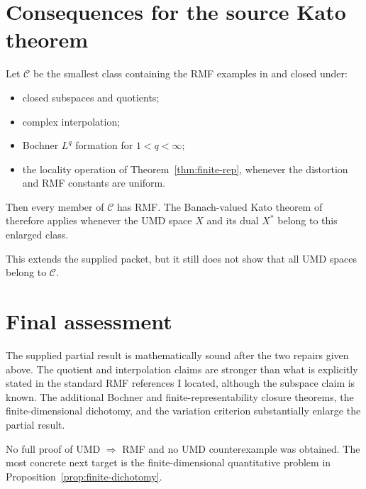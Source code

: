 \documentclass[11pt]{article}
\theoremstyle{definition}
\newcommand{\1}{\mathbf 1}
\begin{document}
\section{Consequences for the source Kato theorem}

Let $\mathcal C$ be the smallest class containing the RMF examples in
\cite{HMP} and closed under:
\begin{itemize}[nosep]
\item closed subspaces and quotients;
\item complex interpolation;
\item Bochner $L^q$ formation for $1<q<\infty$;
\item the locality operation of Theorem~\ref{thm:finite-rep}, whenever the
distortion and RMF constants are uniform.
\end{itemize}
Then every member of $\mathcal C$ has RMF.  The Banach-valued Kato theorem of
\cite{HMP} therefore applies whenever the UMD space $X$ and its dual $X^*$
belong to this enlarged class.

This extends the supplied packet, but it still does not show that all UMD spaces
belong to $\mathcal C$.

\section{Final assessment}

The supplied partial result is mathematically sound after the two repairs given
above.  The quotient and interpolation claims are stronger than what is
explicitly stated in the standard RMF references I located, although the
subspace claim is known.  The additional Bochner and finite-representability
closure theorems, the finite-dimensional dichotomy, and the variation criterion
substantially enlarge the partial result.

No full proof of UMD $\Rightarrow$ RMF and no UMD counterexample was obtained.
The most concrete next target is the finite-dimensional quantitative problem in
Proposition~\ref{prop:finite-dichotomy}.
\end{document}
